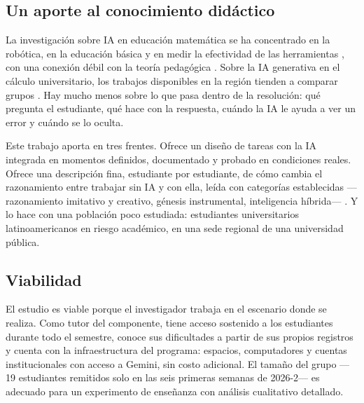 \subsection*{Un aporte al conocimiento didáctico}

La investigación sobre IA en educación matemática se ha concentrado en la robótica, en la educación básica y en medir la efectividad de las herramientas \parencite{mohamed2022slr}, con una conexión débil con la teoría pedagógica \parencite{zawacki2019systematic}. Sobre la IA generativa en el cálculo universitario, los trabajos disponibles en la región tienden a comparar grupos \parencite{mateo2024estrategia}. Hay mucho menos sobre lo que pasa dentro de la resolución: qué pregunta el estudiante, qué hace con la respuesta, cuándo la IA le ayuda a ver un error y cuándo se lo oculta.

Este trabajo aporta en tres frentes. Ofrece un diseño de tareas con la IA integrada en momentos definidos, documentado y probado en condiciones reales. Ofrece una descripción fina, estudiante por estudiante, de cómo cambia el razonamiento entre trabajar sin IA y con ella, leída con categorías establecidas ---razonamiento imitativo y creativo, génesis instrumental, inteligencia híbrida--- \parencite{lithner2008framework,trouche2004managing,molenaar2022hybrid}. Y lo hace con una población poco estudiada: estudiantes universitarios latinoamericanos en riesgo académico, en una sede regional de una universidad pública.

\subsection*{Viabilidad}

El estudio es viable porque el investigador trabaja en el escenario donde se realiza. Como tutor del componente, tiene acceso sostenido a los estudiantes durante todo el semestre, conoce sus dificultades a partir de sus propios registros y cuenta con la infraestructura del programa: espacios, computadores y cuentas institucionales con acceso a Gemini, sin costo adicional. El tamaño del grupo ---19 estudiantes remitidos solo en las seis primeras semanas de 2026-2--- es adecuado para un experimento de enseñanza con análisis cualitativo detallado.
